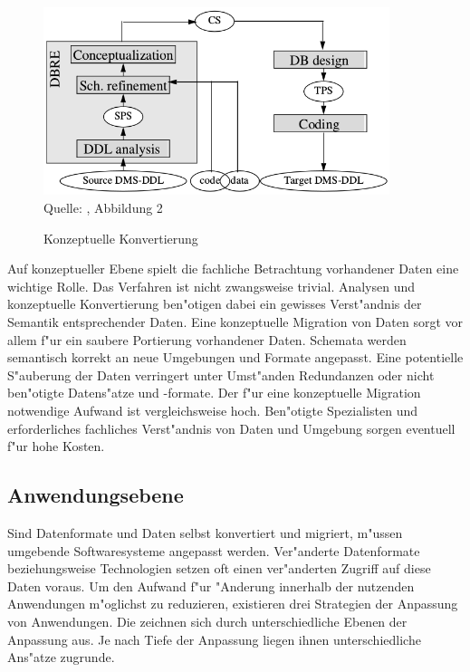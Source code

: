 \begin{figure}[h!]
	\centering
	\caption{Konzeptuelle Konvertierung}
	\label{pic:conversion_conceptual}
	\includegraphics[width=0.9\textwidth]{../images/strategies_fig_02b.png} \\
	\tiny Quelle: \citep{henrard-2002}, Abbildung 2
\end{figure}

Auf konzeptueller Ebene spielt die fachliche Betrachtung vorhandener Daten eine wichtige Rolle. Das Verfahren ist nicht zwangsweise trivial. Analysen und konzeptuelle Konvertierung ben"otigen dabei ein gewisses Verst"andnis der Semantik entsprechender Daten.
\lb
Eine konzeptuelle Migration von Daten sorgt vor allem f"ur ein saubere Portierung vorhandener Daten. Schemata werden semantisch korrekt an neue Umgebungen und Formate angepasst. Eine potentielle S"auberung der Daten verringert unter Umst"anden Redundanzen oder nicht ben"otigte Datens"atze und -formate.
\lb
Der f"ur eine konzeptuelle Migration notwendige Aufwand ist vergleichsweise hoch. Ben"otigte Spezialisten und erforderliches fachliches Verst"andnis von Daten und Umgebung sorgen eventuell f"ur hohe Kosten.

\subsection{Anwendungsebene}

Sind Datenformate und Daten selbst konvertiert und migriert, m"ussen umgebende Softwaresysteme angepasst werden. Ver"anderte Datenformate beziehungsweise Technologien setzen oft einen ver"anderten Zugriff auf diese Daten voraus. Um den Aufwand f"ur "Anderung innerhalb der nutzenden Anwendungen m"oglichst zu reduzieren, existieren drei Strategien der Anpassung von Anwendungen. Die zeichnen sich durch unterschiedliche Ebenen der Anpassung aus. Je nach Tiefe der Anpassung liegen ihnen unterschiedliche Ans"atze zugrunde. 

